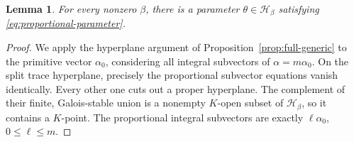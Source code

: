 \documentclass[11pt, reqno]{amsart}
\numberwithin{equation}{section}
\newtheorem{lemma}[theorem]{Lemma}
\theoremstyle{definition}
\theoremstyle{remark}
\newcommand{\mc}[1]{\mathcal{#1}}
\begin{document}
\begin{lemma}\label{lem:ray-generic}
For every nonzero $\beta$, there is a parameter
$\theta\in\mc H_\beta$ satisfying
\eqref{eq:proportional-parameter}.
\end{lemma}
\begin{proof}
We apply the hyperplane argument of Proposition~\ref{prop:full-generic}
to the primitive vector $\alpha_0$, considering all integral subvectors
of $\alpha=m\alpha_0$. On the split trace hyperplane, precisely the
proportional subvector equations vanish identically. Every other one
cuts out a proper hyperplane. The complement of their finite,
Galois-stable union is a nonempty $K$-open subset of $\mc H_\beta$,
so it contains a $K$-point. The proportional integral subvectors are
exactly $\ell\alpha_0$, $0\le\ell\le m$.
\end{proof}
\end{document}
